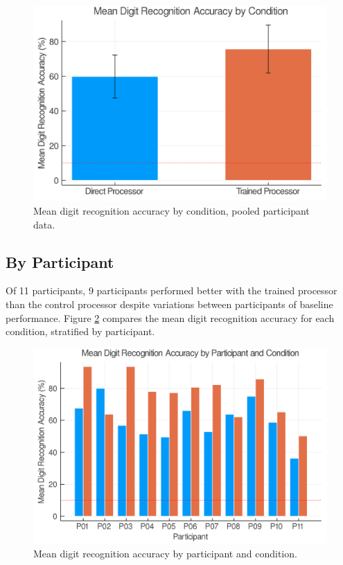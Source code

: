 \documentclass[a4paper,11pt,openany]{book}
\begin{document}
\begin{figure}[htbp]
\centering
\includegraphics[width=.9\linewidth]{./images/results_mean_accuracy_overall.png}
\caption{\label{fig:orgca85631}
Mean digit recognition accuracy by condition, pooled participant data.}
\end{figure}


\subsection*{By Participant}
\label{sec:orga52618e}

Of 11 participants, 9 participants performed better with the trained processor than the control processor despite variations between participants of baseline performance.
Figure \ref{fig:org91d345c} compares the mean digit recognition accuracy for each condition, stratified by participant.

\begin{figure}[htbp]
\centering
\includegraphics[width=.9\linewidth]{./images/results_mean_accuracy_by_participant.png}
\caption{\label{fig:org91d345c}
Mean digit recognition accuracy by participant and condition.}
\end{figure}
\end{document}
